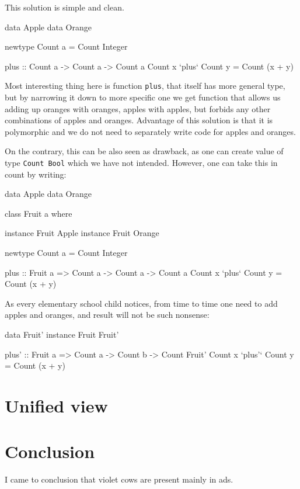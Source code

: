 \documentclass[11pt,oneside,draft]{fithesis2}
\begin{document}
This solution is simple and clean.
\begin{code}
data Apple
data Orange

newtype Count a = Count Integer

plus :: Count a -> Count a -> Count a
Count x `plus` Count y = Count (x + y)
\end{code}
Most interesting thing here is function \texttt{plus}, that itself has more general type, but
by narrowing it down to more specific one we get function that allows us
adding up oranges with oranges, apples with apples, but forbids any other combinations
of apples and oranges. Advantage of this solution is that it is polymorphic
and we do not need to separately write code for apples and oranges.

On the contrary, this can be also seen as drawback, as one can create value
of type \texttt{Count Bool} which we have not intended. However,
one can take this in count by writing:
\begin{code}
data Apple
data Orange

class Fruit a where

instance Fruit Apple
instance Fruit Orange

newtype Count a = Count Integer

plus :: Fruit a => Count a -> Count a -> Count a
Count x `plus` Count y = Count (x + y)
\end{code}

As every elementary school child notices, from time to time one need to add apples and oranges,
and result will not be such nonsense:
\begin{code}
data Fruit'
instance Fruit Fruit'

plus' :: Fruit a => Count a -> Count b -> Count Fruit'
Count x `plus'` Count y = Count (x + y)
\end{code}

\chapter{Unified view}


\chapter{Conclusion}

I came to conclusion that violet cows are present mainly in ads.



\end{document}
